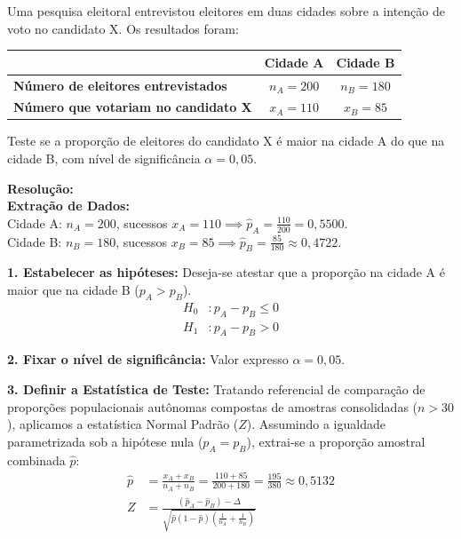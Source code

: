 \documentclass[12pt, a4paper]{article}
\begin{document}
Uma pesquisa eleitoral entrevistou eleitores em duas cidades sobre a intenção de voto no candidato X. Os resultados foram:

\begin{table}[h]
\centering
\begin{tabular}{lcc}
\toprule
\textbf{} & \textbf{Cidade A} & \textbf{Cidade B} \\ \midrule
\textbf{Número de eleitores entrevistados} & $n_A = 200$ & $n_B = 180$ \\
\textbf{Número que votariam no candidato X} & $x_A = 110$ & $x_B = 85$ \\ \bottomrule
\end{tabular}
\end{table}

\medskip\noindent Teste se a proporção de eleitores do candidato X é maior na cidade A do que na cidade B, com nível de significância $\alpha = 0{,}05$.

\vspace{0.3cm}
\noindent\textbf{Resolução:}\\
\textbf{Extração de Dados:} \\
Cidade A: $n_A = 200$, sucessos $x_A = 110 \implies \hat{p}_A = \frac{110}{200} = 0{,}5500$. \\
Cidade B: $n_B = 180$, sucessos $x_B = 85 \implies \hat{p}_B = \frac{85}{180} \approx 0{,}4722$.

\medskip\noindent \textbf{1. Estabelecer as hipóteses:}
Deseja-se atestar que a proporção na cidade A é maior que na cidade B ($p_A > p_B$).
\begin{align*}
H_0 &: p_A - p_B \le 0 \\
H_1 &: p_A - p_B > 0
\end{align*}

\noindent \textbf{2. Fixar o nível de significância:}
Valor expresso $\alpha = 0{,}05$.

\noindent \textbf{3. Definir a Estatística de Teste:}
Tratando referencial de comparação de proporções populacionais autônomas compostas de amostras consolidadas ($n > 30$), aplicamos a estatística Normal Padrão ($Z$). Assumindo a igualdade parametrizada sob a hipótese nula ($p_A = p_B$), extrai-se a proporção amostral combinada $\hat{p}$:
\begin{align*}
\hat{p} &= \frac{x_A + x_B}{n_A + n_B} = \frac{110 + 85}{200 + 180} = \frac{195}{380} \approx \boxed{0{,}5132} \\
Z &= \frac{(\hat{p}_A - \hat{p}_B) - \Delta}{\sqrt{\hat{p}(1-\hat{p})\left(\frac{1}{n_A} + \frac{1}{n_B}\right)}}
\end{align*}
\end{document}
